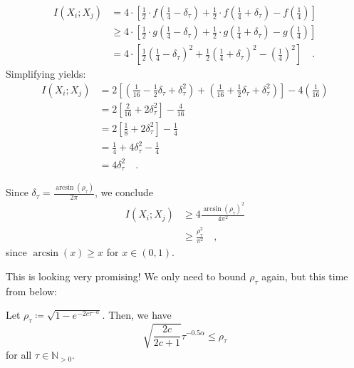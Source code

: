 \documentclass[../../main.tex]{subfiles}
\begin{document}
\begin{align*}
    I(X_i; X_j) &= 4 \cdot \left[ \frac{1}{2} \cdot f(\frac{1}{4} - \delta_\tau) + \frac{1}{2} \cdot f(\frac{1}{4} + \delta_\tau) - f(\frac{1}{4}) \right] \\
    &\geq 4 \cdot \left[ \frac{1}{2} \cdot g(\frac{1}{4} - \delta_\tau) + \frac{1}{2} \cdot g(\frac{1}{4} + \delta_\tau) - g(\frac{1}{4}) \right] \\
    &= 4 \cdot \left[ \frac{1}{2} \left(\frac{1}{4} - \delta_\tau\right)^2 + \frac{1}{2} \left(\frac{1}{4} + \delta_\tau\right)^2 - \left(\frac{1}{4}\right)^2 \right] \quad .
\end{align*}
Simplifying yields:
\begin{align*}
    I(X_i; X_j) &= 2 \left[ \left(\frac{1}{16} - \frac{1}{2}\delta_\tau + \delta_\tau^2\right) + \left(\frac{1}{16} + \frac{1}{2}\delta_\tau + \delta_\tau^2\right) \right] - 4\left(\frac{1}{16}\right) \\
    &= 2 \left[ \frac{2}{16} + 2\delta_\tau^2 \right] - \frac{4}{16} \\
    &= 2 \left[ \frac{1}{8} + 2\delta_\tau^2 \right] - \frac{1}{4} \\
    &= \frac{1}{4} + 4\delta_\tau^2 - \frac{1}{4} \\
    &= 4\delta_\tau^2 \quad .
\end{align*}

Since $\delta_\tau = \frac{\arcsin(\rho_\tau)}{2\pi}$, we conclude
\begin{align*}
    I(X_i; X_j) &\geq 4 \frac{\arcsin(\rho_\tau)^2}{4\pi^2} \\
    &\geq \frac{\rho_\tau^2}{\pi^2} \quad ,
\end{align*}
since $\arcsin(x) \geq x$ for $x \in (0, 1)$.

This is looking very promising! We only need to bound $\rho_\tau$ again, but this time from below:

\begin{lemma}
    \label{lemma:bounding_rho}
    Let $\rho_\tau \coloneqq \sqrt{1 - e^{-2c \tau^{-\alpha}}}$. Then, we have
    \[
        \sqrt{\frac{2c}{2c + 1}} \tau^{-0.5 \alpha} \leq \rho_\tau
    \]
    for all $\tau \in \mathbb{N}_{>0}$.
\end{lemma}
\end{document}
